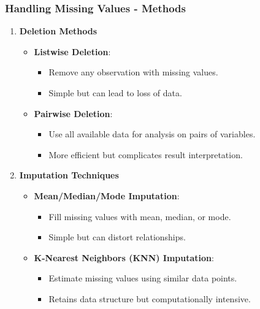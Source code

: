 \documentclass[aspectratio=169]{beamer}
\begin{document}
\begin{frame}[fragile]
    \frametitle{Handling Missing Values - Methods}
    \begin{enumerate}
        \item \textbf{Deletion Methods}
        \begin{itemize}
            \item \textbf{Listwise Deletion}:
            \begin{itemize}
                \item Remove any observation with missing values.
                \item Simple but can lead to loss of data.
            \end{itemize}
            \item \textbf{Pairwise Deletion}:
            \begin{itemize}
                \item Use all available data for analysis on pairs of variables.
                \item More efficient but complicates result interpretation.
            \end{itemize}
        \end{itemize}
        \item \textbf{Imputation Techniques}
        \begin{itemize}
            \item \textbf{Mean/Median/Mode Imputation}:
            \begin{itemize}
                \item Fill missing values with mean, median, or mode.
                \item Simple but can distort relationships.
            \end{itemize}
            \item \textbf{K-Nearest Neighbors (KNN) Imputation}:
            \begin{itemize}
                \item Estimate missing values using similar data points.
                \item Retains data structure but computationally intensive.
            \end{itemize}
        \end{itemize}
    \end{enumerate}
\end{frame}
\end{document}
